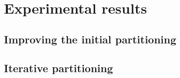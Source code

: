 \chapter{Experimental results}
\section{Improving the initial partitioning}
\section{Iterative partitioning}



